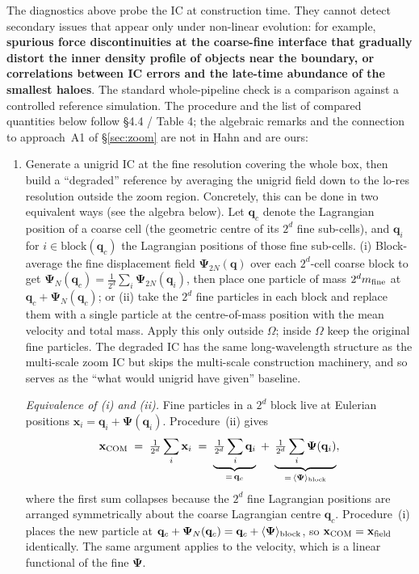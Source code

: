 \documentclass[12pt]{article}
\begin{document}
The diagnostics above probe the IC at construction time. They cannot
detect secondary issues that appear only under non-linear evolution:
for example, \textbf{spurious force discontinuities at the coarse-fine
interface that gradually distort the inner density profile of objects
near the boundary, or correlations between IC errors and the late-time
abundance of the smallest haloes}. The standard whole-pipeline check
is a comparison against a controlled reference simulation. The
procedure and the list of compared quantities below follow
\citet{Hahn2011} \S 4.4 / Table 4; the algebraic remarks and the
connection to approach~A1 of \S\ref{sec:zoom} are not in Hahn and are
ours:
\begin{enumerate}
\item Generate a unigrid IC at the fine resolution covering the whole
      box, then build a ``degraded'' reference by averaging the
      unigrid field down to the lo-res resolution outside the zoom
      region. Concretely, this can be done in two equivalent ways
      (see the algebra below). Let $\mathbf q_c$ denote the Lagrangian
      position of a coarse cell (the geometric centre of its $2^d$
      fine sub-cells), and $\mathbf q_i$ for $i\in\text{block}(\mathbf q_c)$
      the Lagrangian positions of those fine sub-cells.
      (i) Block-average the fine displacement field
      $\boldsymbol\Psi_{2N}(\mathbf q)$ over each $2^d$-cell coarse
      block to get
      $\boldsymbol\Psi_N(\mathbf q_c)=\tfrac{1}{2^d}\sum_{i}\boldsymbol\Psi_{2N}(\mathbf q_i)$,
      then place one particle of mass $2^d m_{\rm fine}$ at
      $\mathbf q_c+\boldsymbol\Psi_N(\mathbf q_c)$;
      or (ii) take the $2^d$ fine particles in each block and replace
      them with a single particle at the centre-of-mass position with
      the mean velocity and total mass. Apply this only outside
      $\Omega$; inside $\Omega$ keep the original fine particles. The
      degraded IC has the same long-wavelength structure as the
      multi-scale zoom IC but skips the multi-scale construction
      machinery, and so serves as the ``what would unigrid have
      given'' baseline.

      \textit{Equivalence of (i) and (ii).} Fine particles in a
      $2^d$ block live at Eulerian positions
      $\mathbf x_i = \mathbf q_i + \boldsymbol\Psi(\mathbf q_i)$.
      Procedure~(ii) gives
      \begin{equation*}
        \mathbf x_{\rm COM} \;=\; \tfrac{1}{2^d}\sum_i\mathbf x_i
        \;=\; \underbrace{\tfrac{1}{2^d}\sum_i\mathbf q_i}_{=\,\mathbf q_c}
        \;+\; \underbrace{\tfrac{1}{2^d}\sum_i\boldsymbol\Psi(\mathbf q_i)}_{=\,\langle\boldsymbol\Psi\rangle_{\rm block}} ,
      \end{equation*}
      where the first sum collapses because the $2^d$ fine Lagrangian
      positions are arranged symmetrically about the coarse Lagrangian
      centre $\mathbf q_c$. Procedure~(i) places the new particle at
      $\mathbf q_c+\boldsymbol\Psi_N(\mathbf q_c)
      =\mathbf q_c+\langle\boldsymbol\Psi\rangle_{\rm block}$,
      so $\mathbf x_{\rm COM}=\mathbf x_{\rm field}$ identically. The
      same argument applies to the velocity, which is a linear
      functional of the fine $\boldsymbol\Psi$.


\end{enumerate}
\end{document}
